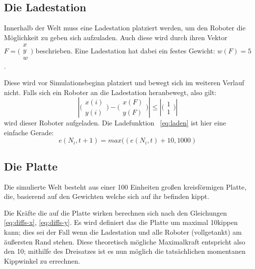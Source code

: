 \subsection{Die Ladestation}\label{fuelstation}
Innerhalb der Welt muss eine Ladestation platziert werden, um den Roboter die M{\"{o}}glichkeit zu geben sich aufzuladen. Auch diese wird durch ihren Vektor $ F = \bigl(\begin{smallmatrix} x \\ y \\ w \end{smallmatrix}\bigr)$ beschrieben. Eine Ladestation hat dabei ein festes Gewicht: $ w(F) = 5 $.

Diese wird vor Simulationsbeginn platziert und bewegt sich im weiteren Verlauf nicht.
Falls sich ein Roboter an die Ladestation heranbewegt, also gilt: 
\begin{equation}\label{eq:dist}
 |\bigl(\begin{smallmatrix} x(i) \\ y(i) \end{smallmatrix}\bigr) - \bigl(\begin{smallmatrix} x(F) \\ y(F) \end{smallmatrix}\bigr)| \leq |\bigl(\begin{smallmatrix} 1 \\ 1 \end{smallmatrix}\bigr)|
\end{equation}
wird dieser Roboter aufgeladen. Die Ladefunktion ~\ref{eq:laden} ist hier eine einfache Gerade:
\begin{equation}
    \label{eq:laden}
	e(N_i, t + 1) = max((e(N_i, t) + 10, 1000) 
\end{equation}

\subsection{Die Platte}\label{plate}
Die simulierte Welt besteht aus einer 100 Einheiten gro{\ss}en kreisf{\"{o}}rmigen Platte, die, basierend auf den Gewichten welche sich auf ihr befinden kippt.

Die Kr{\"{a}}fte die auf die Platte wirken berechnen sich nach den Gleichungen \ref{eq:diffs-x}, \ref{eq:diffs-y}. Es wird definiert das die Platte um
maximal 10\textdegree kippen kann; dies sei der Fall wenn die Ladestation und alle Roboter (vollgetankt) am {\"{a}}u{\ss}ersten Rand stehen. Diese theoretisch
m{\"{o}}gliche Maximalkraft entspricht also den 10\textdegree; mithilfe des Dreisatzes ist es nun m{\"{o}}glich die tats{\"{a}}chlichen momentanen Kippwinkel
zu errechnen.

